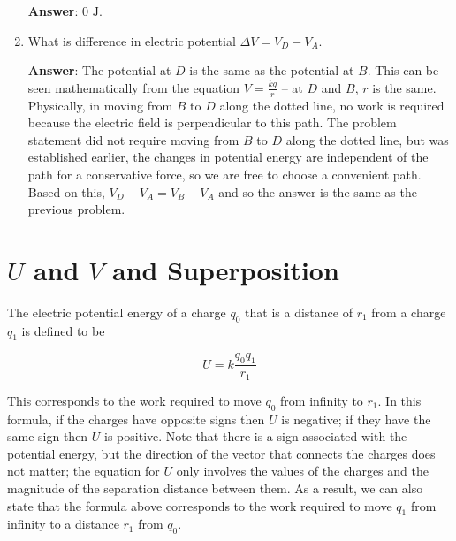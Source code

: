 \documentclass{article}
\begin{document}
\begin{enumerate}
        \ifsolutions
          \textbf{Answer}: $0\text{ J}$.
        \fi

  \item What is difference in electric potential $\Delta V = V_D-V_A$.

        \ifsolutions
          \textbf{Answer}: The potential at $D$ is the same as the potential at $B$. This can be seen mathematically from the equation $V=\frac{kq}{r}$ -- at $D$ and $B$, $r$ is the same. Physically, in moving from $B$ to $D$ along the dotted line, no work is required because the electric field is perpendicular to this path. The problem statement did not require moving from $B$ to $D$ along the dotted line, but was established earlier, the changes in potential energy are independent of the path for a conservative force, so we are free to choose a convenient path. Based on this, $V_D-V_A=V_B-V_A$ and so the answer is the same as the previous problem.
        \fi

\end{enumerate}

\section{$U$ and $V$ and Superposition}






The electric potential energy of a charge $q_0$ that is a distance of $r_1$ from a charge $q_1$ is defined to be 

\begin{equation}
U=k\frac{q_0q_1}{r_1}
\end{equation}

This corresponds to the work required to move $q_0$ from infinity to $r_1$. 
In this formula, if the charges have opposite signs then $U$ is negative; if they have the same sign then $U$  is positive. Note that there is a sign associated with the potential energy, but the direction of the vector that connects the charges does not matter; the equation for $U$ only involves the values of the charges and the magnitude of the separation distance between them. As a result, we can also state that the formula above corresponds to the work required to move $q_1$ from infinity to a distance $r_1$ from $q_0$.
\end{document}
